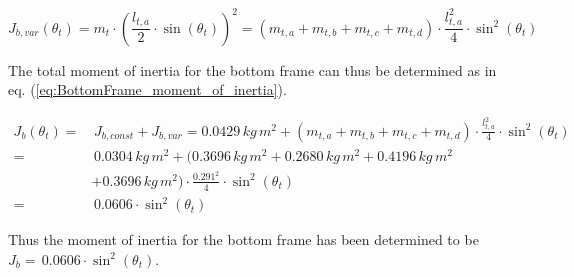 \documentclass[../../main]{subfiles}
\begin{document}
\begin{equation}
  \label{eq:triangleDiagram_moment_of_inertia}
  J_{b,var}(\theta_t) = m_{t} \cdot \left( \frac{l_{t,a}}{2} \cdot \sin(\theta_t) \right)^2 = ( m_{t,a} + m_{t,b} + m_{t,c} + m_{t,d} ) \cdot \frac{l_{t,a}^2}{4} \cdot \sin^2(\theta_t)
\end{equation}

The total moment of inertia for the bottom frame can thus be determined as in eq. (\ref{eq:BottomFrame_moment_of_inertia}).

\begin{equation}
  \label{eq:BottomFrame_moment_of_inertia}
\begin{split}
    J_{b}(\theta_t) =& \, J_{b,const} + J_{b,var} = 0.0429 \si{\, kg \, m^2} + ( m_{t,a} + m_{t,b} + m_{t,c} + m_{t,d} ) \cdot \frac{l_{t,a}^2}{4} \cdot \sin^2(\theta_t)\\
    =& \, 0.0304 \si{\, kg \, m^2} + ( 0.3696 \si{\, kg \, m^2} + 0.2680 \si{\, kg \, m^2} + 0.4196 \si{\, kg \, m^2}\\
    &+ 0.3696 \si{\, kg \, m^2}) \cdot \frac{0.291^2}{4} \cdot \sin^2(\theta_t)\\
    =& \, 0.0606\cdot \sin^2(\theta_t)
\end{split}
\end{equation}

Thus the moment of inertia for the bottom frame has been determined to be
\newline $J_{b} = \, 0.0606 \cdot \sin^2(\theta_t)$.
\end{document}

